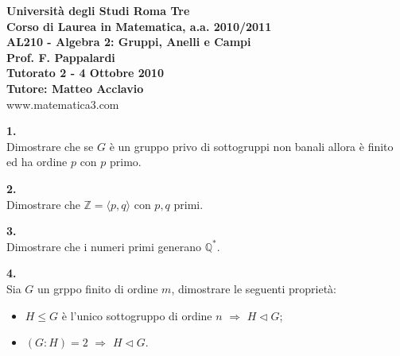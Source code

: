 \documentclass[italian,a4paper,11pt]
{article}
\newcommand{\Q}{\mathbb{Q}}
\newcommand{\Z}{\mathbb Z}
\newcommand{\implica}{\Rightarrow}
\newcommand{\acc}{\`}
\begin{document}
\begin{center}

\textbf{Universit\`a degli Studi Roma Tre}\\

\textbf{Corso di Laurea in Matematica, a.a. 2010/2011}\\

\textbf{AL210 - Algebra 2: Gruppi, Anelli e Campi}\\

\textbf{Prof. F. Pappalardi}\\

\textbf{Tutorato 2 - 4 Ottobre 2010}\\

\textbf{Tutore: Matteo Acclavio}\\

www.matematica3.com\\
\end{center}



\noindent
\begin{Ex}\textbf{ 1.}\\
Dimostrare che se $G$ \acc e un gruppo privo di sottogruppi non banali allora \acc e finito ed ha ordine $p$ con $p$ primo.
\end{Ex}

\vspace{0.4cm}
\noindent
\begin{Ex}\textbf{ 2.}\\
Dimostrare che $\Z=\langle p, q \rangle$ con $p,q$ primi.
\end{Ex}

\vspace{0.4cm}
\noindent
\begin{Ex}\textbf{ 3.}\\
Dimostrare che i numeri primi generano $\Q^{\ast}$.
\end{Ex}

\vspace{0.4cm}
\noindent
\begin{Ex}\textbf{ 4.}\\
Sia $G$ un grppo finito di ordine $m$, dimostrare le seguenti propriet\acc a:
\begin{itemize}
	\item $H\leq G$ \acc e l'unico sottogruppo di ordine $n$ $\implica$ $H\triangleleft G$;
	\item $(G:H)=2 $ $\implica$ $H\triangleleft G$.
\end{itemize}
\end{Ex}
\end{document}
